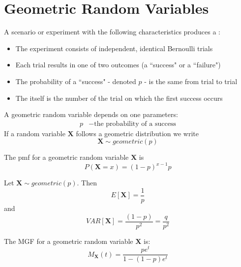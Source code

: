 \documentclass[12pt]{report}
\begin{document}
\section{Geometric Random Variables}

\begin{defn}{}{}
    A scenario or experiment with the following characteristics produces a : \begin{itemize}
        \item The experiment consists of independent, identical Bernoulli trials
        \item Each trial results in one of two outcomes (a ``success" or a ``failure")
        \item The probability of a ``success" - denoted $p$ - is the same from trial to trial
        \item The  itself is the number of the trial on which the first success occurs
    \end{itemize}
\end{defn}


\begin{defn}{}{}
    A geometric random variable depends on one parameters: \begin{align*}
        p &- \text{the probability of a success}
    \end{align*}
    If a random variable $\mathbf{X}$ follows a geometric distribution we write $$\mathbf{X}\sim geometric(p)$$
\end{defn}

\begin{defn}{}{}
    The pmf for a geometric random variable $\mathbf{X}$ is \begin{equation*}
        P(\mathbf{X} = x) = (1-p)^{x-1}p 
    \end{equation*}
\end{defn}

\begin{defn}{}{}
    Let $\mathbf{X}\sim geometric(p)$. Then \begin{equation*}
        E[\mathbf{X}] = \frac{1}{p}
    \end{equation*}
    and
    \begin{equation*}
        VAR[\mathbf{X}] = \frac{(1-p)}{p^2} = \frac{q}{p^2}
    \end{equation*}
\end{defn}


\begin{defn}{}{}
    The MGF for a geometric random variable $\mathbf{X}$ is: \begin{equation*}
        M_{\mathbf{X}}(t) = \frac{pe^t}{1-(1-p)e^t}
    \end{equation*}
\end{defn}
\end{document}
